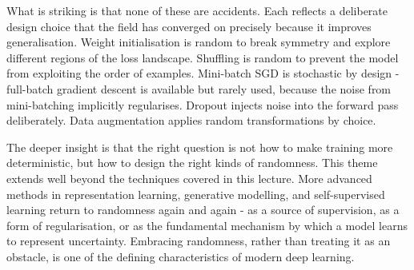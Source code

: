 What is striking is that none of these are accidents. Each reflects a deliberate design choice that the field has converged on precisely because it improves generalisation. Weight initialisation is random to break symmetry and explore different regions of the loss landscape. Shuffling is random to prevent the model from exploiting the order of examples. Mini-batch SGD is stochastic by design - full-batch gradient descent is available but rarely used, because the noise from mini-batching implicitly regularises. Dropout injects noise into the forward pass deliberately. Data augmentation applies random transformations by choice.

The deeper insight is that the right question is not how to make training more deterministic, but how to design the right kinds of randomness. This theme extends well beyond the techniques covered in this lecture. More advanced methods in representation learning, generative modelling, and self-supervised learning return to randomness again and again - as a source of supervision, as a form of regularisation, or as the fundamental mechanism by which a model learns to represent uncertainty. Embracing randomness, rather than treating it as an obstacle, is one of the defining characteristics of modern deep learning.
